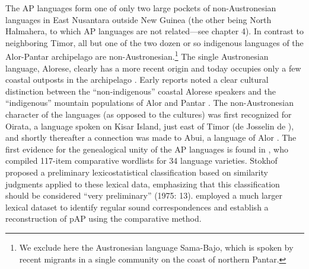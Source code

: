 The AP languages form one of only two large pockets of non-Austronesian languages in East Nusantara outside New Guinea (the other being North Halmahera, to which AP languages are not related---see chapter 4). In contrast to neighboring Timor, all but one of the two dozen or so indigenous languages of the Alor-Pantar archipelago are non-Austronesian.\footnote{ We exclude here the Austronesian language Sama-Bajo, which is spoken by recent migrants in a single community on the coast of northern Pantar.} The single Austronesian language, Alorese, clearly has a more recent origin and today occupies only a few coastal outposts in the archipelago \citep{Klamer2011,Klamerfc}. Early reports noted a clear cultural distinction between the ``non-indigenous'' coastal Alorese speakers and the ``indigenous'' mountain populations of Alor and Pantar \citep[75-8]{Anonymous1914}. The non-Austronesian character of the languages (as opposed to the cultures) was first recognized for Oirata, a
language spoken on Kisar Island, just east of Timor (de Josselin de \citet{DeJong1937}), and shortly thereafter a connection was made to Abui, a language of Alor \citep{Nicolspeyer1940}. The first evidence for the genealogical unity of the AP languages is found in \citet{Stokhof1975}, who compiled 117-item comparative wordlists for 34 language varieties. Stokhof proposed a preliminary lexicostatistical classification based on similarity judgments applied to these lexical data, emphasizing that this classification should be considered ``very preliminary'' (1975: 13). \citep{HoltonEtAl2012} employed a much larger lexical dataset to identify regular sound correspondences and establish a reconstruction of pAP using the comparative method.

